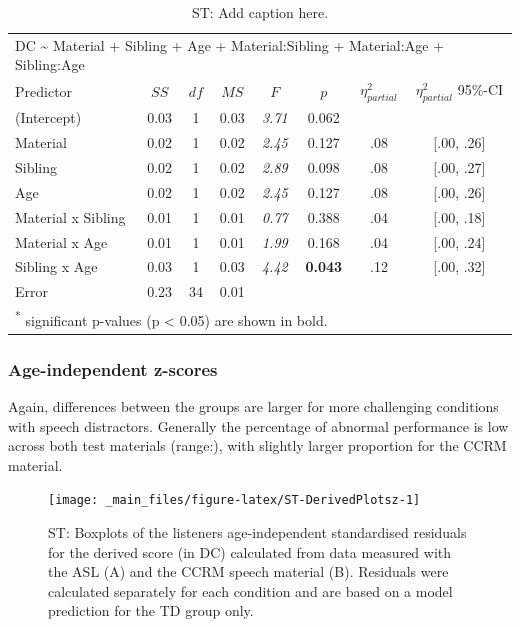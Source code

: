 \documentclass[a4paper, twoside]{templates/ociamthesis}
\begin{document}
\begin{table}

\caption{\label{tab:ST-AgeAltEffTab}ST: Add caption here.}
\centering
\begin{tabular}[t]{lccc>{}cccc}
\toprule
\multicolumn{8}{l}{DC \textasciitilde{} Material + Sibling + Age + Material:Sibling + Material:Age + Sibling:Age} \\
\cmidrule(l{3pt}r{3pt}){1-8}
Predictor & $SS$ & $df$ & $MS$ & $F$ & $p$ & $\eta^{2}_{partial}$ & $\eta^{2}_{partial}$ 95\%-CI\\
\midrule
(Intercept) & 0.03 & 1 & 0.03 & \em{3.71} & 0.062 &  & \\
Material & 0.02 & 1 & 0.02 & \em{2.45} & 0.127 & .08 & [.00, .26]\\
Sibling & 0.02 & 1 & 0.02 & \em{2.89} & 0.098 & .08 & [.00, .27]\\
Age & 0.02 & 1 & 0.02 & \em{2.45} & 0.127 & .08 & [.00, .26]\\
Material x Sibling & 0.01 & 1 & 0.01 & \em{0.77} & 0.388 & .04 & [.00, .18]\\
Material x Age & 0.01 & 1 & 0.01 & \em{1.99} & 0.168 & .04 & [.00, .24]\\
Sibling x Age & 0.03 & 1 & 0.03 & \em{4.42} & \textbf{0.043} & .12 & [.00, .32]\\
Error & 0.23 & 34 & 0.01 & \em{} &  &  & \\
\bottomrule
\multicolumn{8}{l}{\textsuperscript{*} significant p-values (p < 0.05) are shown in bold.}\\
\end{tabular}
\end{table}

\hypertarget{age-independent-z-scores-1}{%
\subsubsection{Age-independent z-scores}\label{age-independent-z-scores-1}}

Again, differences between the groups are larger for more challenging conditions with speech distractors.
Generally the percentage of abnormal performance is low across both test materials (range:), with slightly larger proportion for the CCRM material.

\begin{figure}

{\centering \texttt{[image: \_main\_files/figure-latex/ST-DerivedPlotsz-1]} 

}

\caption{ST: Boxplots of the listeners age-independent standardised residuals for the derived score (in DC) calculated from data measured with the ASL (A) and the CCRM speech material (B). Residuals were calculated separately for each condition and are based on a model prediction for the TD group only.}\label{fig:ST-DerivedPlotsz}
\end{figure}
\end{document}
